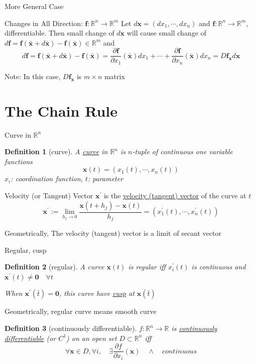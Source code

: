 \documentclass[a4paper,11pt]{article}
\newtheorem{defn}{Definition}
\newcommand{\bb}{\mathbb}
\newcommand{\bd}{\mathbf}
\newcommand{\p}{\partial}
\begin{document}
\begin{frame}[t]{More General Case}
	\begin{block}
		{Changes in All Direction: $\bd f:\bb{R}^n\rightarrow \bb{R}^m$}
		Let $d \bd x = (d x_1, \cdots, d x_n)$ and $\bd f:\bb{R}^n\rightarrow\bb{R}^m$, differentiable. Then small change of $d\bd x$ will cause small change of $d\bd f=\bd f(\bar{\bd x} + d \bar{\bd x}) - \bd f(\bar{\bd x})\in\bb{R}^m$ and \[
			d\bd f = \bd f(\bar{\bd x} + d \bar{\bd x}) - \bd f(\bar{\bd x}) = \frac{\p \bd f}{\p x_1}(\bar{\bd x})dx_1 + \cdots +\frac{\p \bd f}{\p x_n}(\bar{\bd x})dx_n= D\bd f_{\bd x} d\bd x
		\]
	\end{block}
	Note: In this case, $D\bd f_{\bd x}$ is $m\times n$ matrix
\end{frame}
\section{The Chain Rule} %
\label{sec:the_chain_rule}
\begin{frame}[t]{Curve in $\bb{R}^n$}
	\begin{defn}
		[curve] A \uline{curve} in $\bb{R}^n$ is $n$-tuple of continuous one variable functions\[
			\bd x(t) = (x_1(t),\cdots,x_n(t))
		\]
		$x_i$: coordination function, $t$: parameter
	\end{defn}
	\begin{block}
		{Velocity (or Tangent) Vector}
		$\bd{x}^\prime$ is the \uline{velocity (tangent) vector} of the curve at $t$\[
			\bd{x}^\prime := \lim_{h_j\rightarrow 0}\frac{\bd{x}(t+h_j)-\bd{x}(t)}{h_j}=(x_1^\prime(t),\cdots,x_n^\prime(t))
		\]
	\end{block}
	Geometrically, The velocity (tangent) vector is a limit of secant vector
\end{frame}
\begin{frame}[t]{Regular, cusp}
	\begin{defn}
		[regular] A curve $\bd x(t)$ is regular iff $x_i^\prime(t) $ is continuous and $\bd x^\prime(t)\neq \bd{0}\quad \forall t$
		
		When $\bd x^\prime(\bar t) = \bd{0}$, this curve have \uline{cusp} at $\bd{x}(\bar t)$
	\end{defn}
	Geometrically, regular curve means smooth curve
	
	\begin{defn}
		[continuously differentiable] $f:\bb{R}^n\rightarrow\bb{R}$ is \uline{continuously differentiable} (or $C^1$) on an open set $ D\subset\bb{R}^n$ iff \[
			\forall\bd x\in D, \forall i, \quad \exists \frac{\p f}{\p x_i}(\bd x) \quad\land\quad continuous
		\]
	\end{defn}
\end{frame}
\end{document}

